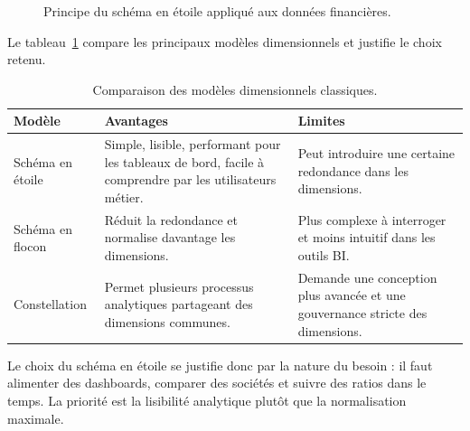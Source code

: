 \begin{figure}[H]
\centering
{}
\caption[Principe du schéma en étoile]{Principe du schéma en étoile appliqué aux données financières.}
\label{fig:schemas}
\end{figure}

\par Le tableau~\ref{tab:modelesdimensionnels} compare les principaux modèles
dimensionnels et justifie le choix retenu.

\begin{table}[H]
\centering
\caption[Comparaison des modèles dimensionnels]{Comparaison des modèles dimensionnels classiques.}
\label{tab:modelesdimensionnels}
\begin{tabularx}{\linewidth}{|p{3.2cm}|X|X|}
\hline
\textbf{Modèle} & \textbf{Avantages} & \textbf{Limites} \\ \hline
Schéma en étoile & Simple, lisible, performant pour les tableaux de bord, facile à comprendre par les utilisateurs métier. & Peut introduire une certaine redondance dans les dimensions. \\ \hline
Schéma en flocon & Réduit la redondance et normalise davantage les dimensions. & Plus complexe à interroger et moins intuitif dans les outils BI. \\ \hline
Constellation & Permet plusieurs processus analytiques partageant des dimensions communes. & Demande une conception plus avancée et une gouvernance stricte des dimensions. \\ \hline
\end{tabularx}
\end{table}

\par Le choix du schéma en étoile se justifie donc par la nature du besoin : il
faut alimenter des dashboards, comparer des sociétés et suivre des ratios dans
le temps. La priorité est la lisibilité analytique plutôt que la normalisation
maximale.

